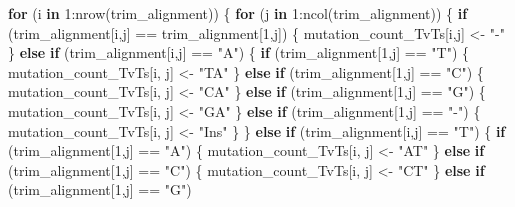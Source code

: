 \documentclass[
]{article}
\newenvironment{Shaded}{\begin{snugshade}}{\end{snugshade}}
\newcommand{\ControlFlowTok}[1]{\textcolor[rgb]{0.13,0.29,0.53}{\textbf{#1}}}
\newcommand{\DecValTok}[1]{\textcolor[rgb]{0.00,0.00,0.81}{#1}}
\newcommand{\FunctionTok}[1]{\textcolor[rgb]{0.00,0.00,0.00}{#1}}
\newcommand{\NormalTok}[1]{#1}
\newcommand{\OtherTok}[1]{\textcolor[rgb]{0.56,0.35,0.01}{#1}}
\newcommand{\SpecialCharTok}[1]{\textcolor[rgb]{0.00,0.00,0.00}{#1}}
\newcommand{\StringTok}[1]{\textcolor[rgb]{0.31,0.60,0.02}{#1}}
\begin{document}
\begin{Shaded}
\begin{Highlighting}[]
\ControlFlowTok{for}\NormalTok{ (i }\ControlFlowTok{in} \DecValTok{1}\SpecialCharTok{:}\FunctionTok{nrow}\NormalTok{(trim\_alignment)) }
\NormalTok{\{}
  \ControlFlowTok{for}\NormalTok{ (j }\ControlFlowTok{in} \DecValTok{1}\SpecialCharTok{:}\FunctionTok{ncol}\NormalTok{(trim\_alignment)) }
\NormalTok{  \{}
    \ControlFlowTok{if}\NormalTok{ (trim\_alignment[i,j] }\SpecialCharTok{==}\NormalTok{ trim\_alignment[}\DecValTok{1}\NormalTok{,j]) }
\NormalTok{    \{}
\NormalTok{      mutation\_count\_TvTs[i,j] }\OtherTok{\textless{}{-}} \StringTok{"{-}"}
\NormalTok{    \} }
    \ControlFlowTok{else} \ControlFlowTok{if}\NormalTok{ (trim\_alignment[i,j] }\SpecialCharTok{==} \StringTok{"A"}\NormalTok{)}
\NormalTok{    \{}
      \ControlFlowTok{if}\NormalTok{ (trim\_alignment[}\DecValTok{1}\NormalTok{,j] }\SpecialCharTok{==} \StringTok{"T"}\NormalTok{)}
\NormalTok{      \{}
\NormalTok{        mutation\_count\_TvTs[i, j] }\OtherTok{\textless{}{-}} \StringTok{"TA"}
\NormalTok{      \}}
      \ControlFlowTok{else} \ControlFlowTok{if}\NormalTok{ (trim\_alignment[}\DecValTok{1}\NormalTok{,j] }\SpecialCharTok{==} \StringTok{"C"}\NormalTok{)}
\NormalTok{      \{}
\NormalTok{        mutation\_count\_TvTs[i, j] }\OtherTok{\textless{}{-}} \StringTok{"CA"}
\NormalTok{      \}}
      \ControlFlowTok{else} \ControlFlowTok{if}\NormalTok{ (trim\_alignment[}\DecValTok{1}\NormalTok{,j] }\SpecialCharTok{==} \StringTok{"G"}\NormalTok{)}
\NormalTok{      \{}
\NormalTok{        mutation\_count\_TvTs[i, j] }\OtherTok{\textless{}{-}} \StringTok{"GA"}
\NormalTok{      \}}
      \ControlFlowTok{else} \ControlFlowTok{if}\NormalTok{ (trim\_alignment[}\DecValTok{1}\NormalTok{,j] }\SpecialCharTok{==} \StringTok{"{-}"}\NormalTok{)}
\NormalTok{      \{}
\NormalTok{        mutation\_count\_TvTs[i, j] }\OtherTok{\textless{}{-}} \StringTok{"Ins"}
\NormalTok{      \}}
\NormalTok{    \}}
    \ControlFlowTok{else} \ControlFlowTok{if}\NormalTok{ (trim\_alignment[i,j] }\SpecialCharTok{==} \StringTok{"T"}\NormalTok{)}
\NormalTok{    \{}
      \ControlFlowTok{if}\NormalTok{ (trim\_alignment[}\DecValTok{1}\NormalTok{,j] }\SpecialCharTok{==} \StringTok{"A"}\NormalTok{)}
\NormalTok{      \{}
\NormalTok{        mutation\_count\_TvTs[i, j] }\OtherTok{\textless{}{-}} \StringTok{"AT"}
\NormalTok{      \}}
      \ControlFlowTok{else} \ControlFlowTok{if}\NormalTok{ (trim\_alignment[}\DecValTok{1}\NormalTok{,j] }\SpecialCharTok{==} \StringTok{"C"}\NormalTok{)}
\NormalTok{      \{}
\NormalTok{        mutation\_count\_TvTs[i, j] }\OtherTok{\textless{}{-}} \StringTok{"CT"}
\NormalTok{      \}}
      \ControlFlowTok{else} \ControlFlowTok{if}\NormalTok{ (trim\_alignment[}\DecValTok{1}\NormalTok{,j] }\SpecialCharTok{==} \StringTok{"G"}\NormalTok{)}

\end{Highlighting}
\end{Shaded}
\end{document}
